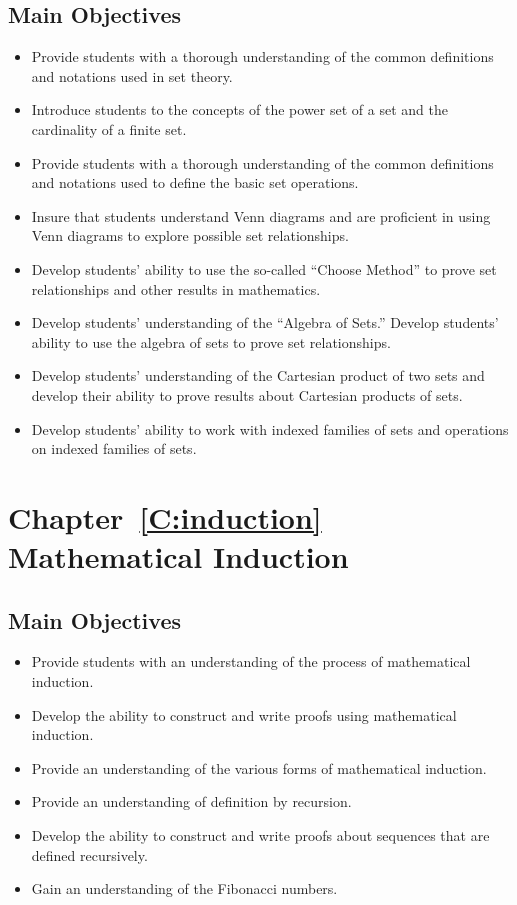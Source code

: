 \section*{Main Objectives}
\begin{itemize}
\item Provide students with a thorough understanding of the common definitions and notations used in set theory.
\item  Introduce students to the concepts of the power set of a set and the cardinality of a finite set.
\item Provide students with a thorough understanding of the common definitions and notations used to define the basic set operations.
\item  Insure that students understand Venn diagrams and are proficient in using Venn diagrams to explore possible set relationships.
\item  Develop students' ability to use the so-called ``Choose Method'' to prove set relationships and other results in mathematics.
\item Develop students' understanding of the ``Algebra of Sets.''  Develop students' ability to use the algebra of sets to prove set relationships.
\item Develop students' understanding of the Cartesian product of two sets and develop their ability to prove results about Cartesian products of sets.
\item Develop students' ability to work with indexed families of sets and operations on indexed families of sets.
\end{itemize}
\hbreak







\chapter*{Chapter~\ref{C:induction} \\Mathematical Induction}

\section*{Main Objectives}
\begin{itemize}
\item Provide students with an understanding of the process of mathematical induction.
\item Develop the ability to construct and write proofs using mathematical induction.
\item Provide an understanding of the various forms of mathematical induction.
\item Provide an understanding of definition by recursion.
\item Develop the ability to construct and write proofs about sequences that are defined recursively.
\item Gain an understanding of the Fibonacci numbers.
\end{itemize}
\hbreak

